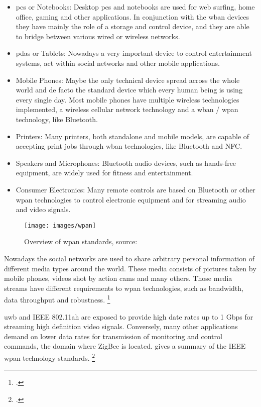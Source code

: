 \begin{itemize}
  \item \glspl{pc} or Notebooks: Desktop \glspl{pc} and notebooks are used for web surfing, home office, gaming and other applications. In conjunction with the \gls{wban} devices they have mainly the role of a storage and control device, and they are able to bridge between various wired or wireless networks.
  \item \glspl{pda} or Tablets: Nowadays a very important device to control entertainment systems, act within social networks and other mobile applications.
  \item Mobile Phones: Maybe the only technical device spread across the whole world and de facto the standard device which every human being is using every single day. Most mobile phones have multiple wireless technologies implemented, a wireless cellular network technology and a \gls{wban} / \gls{wpan} technology, like Bluetooth.
  \item Printers: Many printers, both standalone and mobile models, are capable of accepting print jobs through \gls{wban} technologies, like Bluetooth and NFC.
  \item Speakers and Microphones: Bluetooth audio devices, such as hands-free equipment, are widely used for fitness and entertainment.
  \item Consumer Electronics: Many remote controls are based on Bluetooth or other \gls{wpan} technologies to control electronic equipment and for streaming audio and video signals.
\end{itemize}

\begin{figure}[ht]
  \centering
  \texttt{[image: images/wpan]}
  \caption{Overview of \gls{wpan} standards, source: \cite[143]{Jawad2014}}
  \label{fig:wpan}
\end{figure}

Nowadays the social networks are used to share arbitrary personal information of different media types around the world. These media consists of pictures taken by mobile phones, videos shot by action cams and many others. Those media streams have different requirements to \gls{wpan} technologies, such as bandwidth, data throughput and robustness. \footcite[Cf.][60]{Yang2008}

\gls{uwb} and IEEE 802.11ah are exposed to provide high date rates up to 1 Gbps for streaming high definition video signals. Conversely, many other applications demand on lower data rates for transmission of monitoring and control commands, the domain where ZigBee is located.  gives a summary of the IEEE \gls{wpan} technology standards. \footcite[Cf.][654]{Garg2007}

